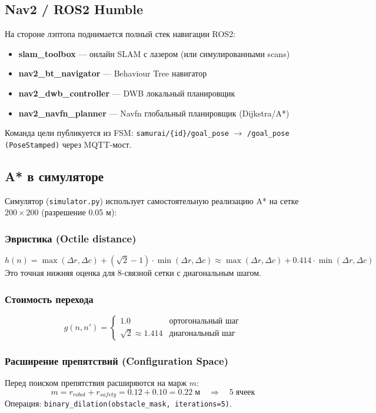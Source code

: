 \documentclass[12pt, a4paper]{article}
\begin{document}
\subsection{Nav2 / ROS2 Humble}
На стороне лэптопа поднимается полный стек навигации ROS2:
\begin{itemize}[noitemsep]
  \item \textbf{slam\_toolbox} — онлайн SLAM с лазером (или симулированными scans)
  \item \textbf{nav2\_bt\_navigator} — Behaviour Tree навигатор
  \item \textbf{nav2\_dwb\_controller} — DWB локальный планировщик
  \item \textbf{nav2\_navfn\_planner} — Navfn глобальный планировщик (Dijkstra/A*)
\end{itemize}
Команда цели публикуется из FSM: \texttt{samurai/\{id\}/goal\_pose} $\to$ \texttt{/goal\_pose (PoseStamped)} через MQTT-мост.

\subsection{A* в симуляторе}
\label{sec:astar}

Симулятор (\texttt{simulator.py}) использует самостоятельную реализацию A* на сетке $200{\times}200$ (разрешение 0.05 м):

\subsubsection{Эвристика (Octile distance)}
\begin{equation}
  h(n) = \max(\Delta r, \Delta c) + (\sqrt{2}-1)\cdot\min(\Delta r, \Delta c)
  \approx \max(\Delta r, \Delta c) + 0.414\cdot\min(\Delta r, \Delta c)
\end{equation}
Это точная нижняя оценка для 8-связной сетки с диагональным шагом.

\subsubsection{Стоимость перехода}
\begin{equation}
  g(n, n') =
  \begin{cases}
    1.0    & \text{ортогональный шаг} \\
    \sqrt{2} \approx 1.414 & \text{диагональный шаг}
  \end{cases}
\end{equation}

\subsubsection{Расширение препятствий (Configuration Space)}
Перед поиском препятствия расширяются на марж $m$:
\begin{equation}
  m = r_{robot} + r_{safety} = 0.12 + 0.10 = 0.22\;\text{м} \quad \Rightarrow\quad 5\;\text{ячеек}
\end{equation}
Операция: \texttt{binary\_dilation(obstacle\_mask, iterations=5)}.
\end{document}
